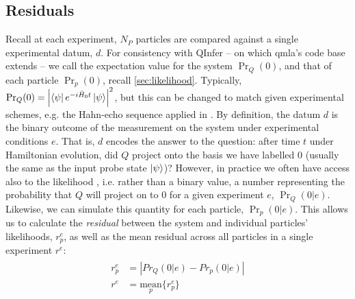 \subsection{Residuals}\label{sec:residuals}
Recall at each experiment, $N_P$ particles are compared against a single experimental datum, $d$. 
For consistency with QInfer \cite{qinfer-1_0} -- on which \gls{qmla}'s code base extends --
    we call the expectation value for the system $\Pr_Q(0)$, 
    and that of each particle $\Pr_p(0)$, recall \cref{sec:likelihood}. 
Typically, $\Pr_Q(0) = \left| \bra{\psi} e^{-i\hat{H}_0 t} \ket{\psi} \right|^2$, 
    but this can be changed to match given experimental schemes, 
    e.g. the Hahn-echo sequence applied in \cite{gentile2020learning}. 
By definition, the datum $d$ is the binary outcome of the measurement on the system under experimental conditions $e$.
That is, $d$ encodes the answer to the question: 
    after time $t$ under Hamiltonian evolution, did $Q$ project onto 
    the basis we have labelled $0$ (usually the same as the input probe state $\ket{\psi}$)?
However, in practice we often have access also to the \gls{likelihood} , 
    i.e. rather than a binary value, a number representing the probability that 
    $Q$ will project on to $0$ for a given experiment $e$, $\Pr_Q(0 | e)$. 
Likewise, we can simulate this quantity for each particle, $\Pr_p(0 | e)$. 
This allows us to calculate the \emph{residual} between the system and individual particles' likelihoods, 
    $r_p^e$, as well as the mean residual across all particles in a single experiment $r^e$:
\begin{align}
    \label{eqn:particle_residual}
    \begin{split}
    r_p^e & = \left| Pr_Q(0 | e) - Pr_p(0 | e) \right|  \\
    r^e &= \underset{p}{\text{mean}} \{r_p^e\}
    \end{split}
\end{align}
\par 

